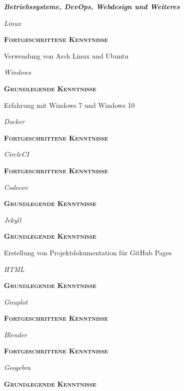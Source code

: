 \documentclass[8pt]{article}
\newcommand{\cvSubsectionStyle}{%
  \normalfont%
  \sffamily%
  \itshape%
  \bfseries%
  \color{cvSubsectionColor}%
}
\newcommand{\cvSubsection}[1]{%
  \begin{tcolorbox}[left=0pt, top=0pt, bottom=0pt, right=0pt, boxsep=5pt, arc=5pt, frame code={}, colback=cvBackgroundColor]
    \cvSubsectionStyle #1%
  \end{tcolorbox}
}
\newenvironment{cvSkillItem}[2]{
  \par
  \begin{minipage}[c]{0.2\linewidth}
    \raggedleft
    \normalfont
    \sffamily
    \itshape
    #1
  \end{minipage}
  \hspace{0.02\linewidth}
  \vrule
  \hspace{0.02\linewidth}
  \begin{minipage}[t]{0.74\linewidth}
    \sffamily\textsc{\color{cvColor} \textbf{#2}}\par
    \normalfont\footnotesize\sffamily\color{cvContentColor}
}{
  \end{minipage}
  \par%
  \vspace{\baselineskip}%
}
\begin{document}
    \cvSubsection{Betriebssysteme, DevOps, Webdesign und Weiteres}
      \vspace{-1.8em}
      \begin{multicols}{2}
        \begin{cvSkillItem}{Linux}{Fortgeschrittene Kenntnisse}
          Verwendung von Arch Linux und Ubuntu
        \end{cvSkillItem}
        \begin{cvSkillItem}{Windows}{Grundlegende Kenntnisse}
          Erfahrung mit Windows 7 und Windows 10
        \end{cvSkillItem}
        \begin{cvSkillItem}{Docker}{Fortgeschrittene Kenntnisse}
        \end{cvSkillItem}
        \begin{cvSkillItem}{CircleCI}{Fortgeschrittene Kenntnisse}
        \end{cvSkillItem}
        \begin{cvSkillItem}{Codecov}{Grundlegende Kenntnisse}
        \end{cvSkillItem}
        \begin{cvSkillItem}{Jekyll}{Grundlegende Kenntnisse}
          Erstellung von Projektdokumentation für GitHub Pages
        \end{cvSkillItem}
        \begin{cvSkillItem}{HTML}{Grundlegende Kenntnisse}
        \end{cvSkillItem}
        \begin{cvSkillItem}{Gnuplot}{Fortgeschrittene Kenntnisse}
        \end{cvSkillItem}
        \begin{cvSkillItem}{Blender}{Fortgeschrittene Kenntnisse}
        \end{cvSkillItem}
        \begin{cvSkillItem}{Geogebra}{Grundlegende Kenntnisse}
        \end{cvSkillItem}
      \end{multicols}
\end{document}
